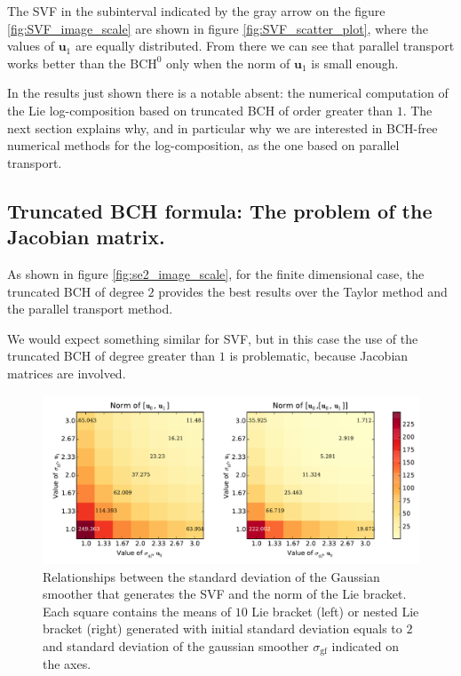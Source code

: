 The SVF in the subinterval indicated by the gray arrow on the figure \ref{fig:SVF_image_scale} are shown in figure \ref{fig:SVF_scatter_plot}, where the values of $\mathbf{u}_1$ are equally distributed. From there we can see that parallel transport works better than the $\text{BCH}^0$ only when the norm of $\mathbf{u}_1$ is small enough.

In the results just shown there is a notable absent: the numerical computation of the Lie log-composition based on truncated BCH of order greater than $1$. The next section explains why, and in particular why we are interested in BCH-free numerical methods for the log-composition, as the one based on parallel transport.


\subsection{Truncated BCH formula: The problem of the Jacobian matrix.}\label{se:jacobian_problem}

As shown in figure \ref{fig:se2_image_scale}, for the finite dimensional case, the truncated BCH of degree $2$ provides the best results over the Taylor method and the parallel transport method.

We would expect something similar for SVF, but in this case the use of the truncated BCH of degree greater than $1$ is problematic, because Jacobian matrices are involved.

\begin{figure}[!ht]
	\hspace{0cm}
	\includegraphics[scale=0.5]{figures/SVF_image_scale_bracket_versus_gaussian.pdf}
	\caption{Relationships between the standard deviation of the Gaussian smoother that generates the SVF and the norm of the Lie bracket. Each square contains the means of $10$ Lie bracket (left) or nested Lie bracket (right) generated with initial standard deviation equals to $2$ and standard deviation of the gaussian smoother $\sigma_{\text{gf}}$ indicated on the axes.}
	\label{fig:SVF_image_scale_bracket_versus_gaussian}
\end{figure}


